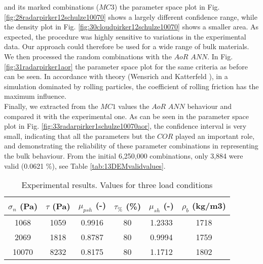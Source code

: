 \documentclass[review]{elsarticle}
\begin{document}
and its marked combinations ($MC3$) the parameter space plot in Fig.
\ref{fig:28radarpirker12schulze10070} shows a largely different confidence
range, while the density plot in Fig. \ref{fig:30cloudpirker12schulze10070} 
shows a smaller area. As expected, the procedure was highly sensitive to
variations in the experimental data.
Our approach could therefore be used
for a wide range of bulk materials.\\
We then processed the random combinations with the $AoR$ $ANN$. In Fig.
\ref{fig:31radarpirker1aor} the parameter space plot for the same criteria as
before can be seen.
In accordance with theory (Wensrich and Katterfeld \cite{RefWorks:87}), in a simulation dominated
by rolling particles, the coefficient of rolling friction has the maximum
influence. \\
Finally, we extracted from the $MC1$ values the $AoR$ $ANN$ behaviour
and compared it with the experimental one.
As can be seen in the parameter space plot in Fig.
\ref{fig:33radarpirker1schulze10070aor}, the confidence interval is very small,
indicating that all the parameters but the $COR$ played an important role, 
and demonstrating the reliability of these parameter
combinations in representing the bulk behaviour.
From the initial 6,250,000 combinations, only 3,884 were valid (0.0621
\%), see Table \ref{tab:13DEMvalidvalues}.
\begin{table}[h]
\centering
\begin{tabular}{cccccc}
\hline
$\sigma_n$ (Pa) & $\tau$ (Pa) & $\mu_{psh}$ (-) & $\tau_{\%}$ (\%) &
$\mu_{sh}$ (-) & $\rho_b$ (kg/m3) \\
\hline
    1068  & 1059  & 0.9916 & 80 & 1.2333 & 1718 \\
    2069  & 1818  & 0.8787 & 80 & 0.9994 & 1759 \\
    10070 & 8232  & 0.8175 & 80 & 1.1712 & 1802 \\

\hline
\end{tabular}
\caption[Experimental results]{Experimental results. Values for three
load conditions}
\label{tab:05sinterTableExperimental}
\end{table}
\end{document}
